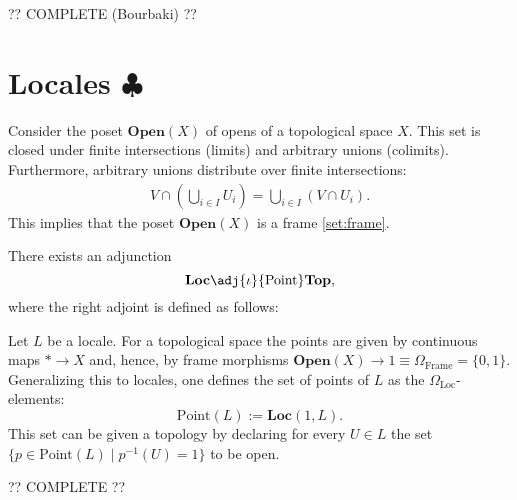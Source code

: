     ?? COMPLETE (Bourbaki) ??

\section{\texorpdfstring{Locales $\clubsuit$}{Locales}}

    \begin{property}
        Consider the poset $\textbf{Open}(X)$ of opens of a topological space $X$. This set is closed under finite intersections (limits) and arbitrary unions (colimits). Furthermore, arbitrary unions distribute over finite intersections:
        \begin{gather}
            V\cap\left(\bigcup_{i\in I}U_i\right) = \bigcup_{i\in I}\left(V\cap U_i\right).
        \end{gather}
        This implies that the poset $\textbf{Open}(X)$ is a frame \ref{set:frame}.
    \end{property}

    \begin{construct}
        There exists an adjunction \[\textbf{Loc}\adj{\iota}{\text{Point}}\textbf{Top},\] where the right adjoint is defined as follows:

        \qquad Let $L$ be a locale. For a topological space the points are given by continuous maps $\ast\rightarrow X$ and, hence, by frame morphisms $\textbf{Open}(X)\rightarrow1\equiv\Omega_{\text{Frame}}=\{0, 1\}$. Generalizing this to locales, one defines the set of points of $L$ as the $\Omega_{\text{Loc}}$-elements: \[\text{Point}(L) := \textbf{Loc}(1, L).\] This set can be given a topology by declaring for every $U\in L$ the set $\{p\in\text{Point}(L)\mid p^{-1}(U) = 1\}$ to be open.
    \end{construct}


    ?? COMPLETE ??